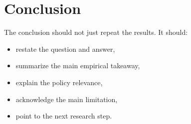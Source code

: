 \section{Conclusion}

The conclusion should not just repeat the results. It should:

\begin{itemize}
    \item restate the question and answer,
    \item summarize the main empirical takeaway,
    \item explain the policy relevance,
    \item acknowledge the main limitation,
    \item point to the next research step.
\end{itemize}
